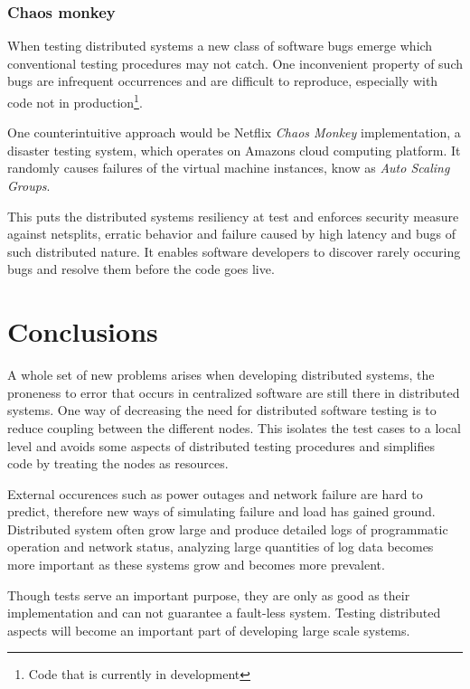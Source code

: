 \documentclass[10pt]{sensys-abstract}
\begin{document}

\subsubsection{Chaos monkey}\noindent
When testing distributed systems a new class of software bugs emerge which conventional testing procedures may not catch. One inconvenient property of such bugs are infrequent occurrences and are difficult to reproduce, especially with code not in production\footnote{Code that is currently in development}.

One counterintuitive approach would be Netflix \emph{Chaos Monkey} implementation, a disaster testing system, which operates on Amazons cloud computing platform. It randomly causes failures of the virtual machine instances, know as \emph{Auto Scaling Groups}.\cite{netflix_chaosmonkey}

This puts the distributed systems resiliency at test and enforces security measure against netsplits, erratic behavior and failure caused by high latency and bugs of such distributed nature. It enables software developers to discover rarely occuring bugs and resolve them before the code goes live.

\section{Conclusions}
\noindent
A whole set of new problems arises when developing distributed systems, the proneness to error that occurs in centralized software are still there in distributed systems. One way of decreasing the need for distributed software testing is to reduce coupling between the different nodes. This isolates the test cases to a local level and avoids some aspects of distributed testing procedures and simplifies code by treating the nodes as resources.

External occurences such as power outages and network failure are hard to predict, therefore new ways of simulating failure and load has gained ground. Distributed system often grow large and produce detailed logs of programmatic operation and network status, analyzing large quantities of log data becomes more important as these systems grow and becomes more prevalent.

Though tests serve an important purpose, they are only as good as their implementation and can not guarantee a fault-less system. Testing distributed aspects will become an important part of developing large scale systems.

\newpage
%

%
%

\balancecolumns
\end{document}
